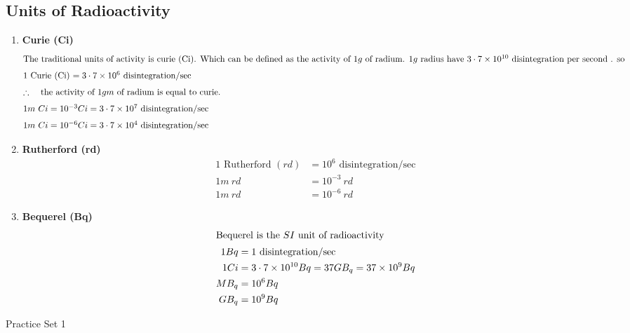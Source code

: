 \subsection{Units of Radioactivity}
\begin{enumerate}
\item \textbf{ Curie (Ci)}
\begin{align*}
\intertext{The traditional units of activity is curie (Ci). Which can be defined as the activity of $1g$ of radium. $1g$ radius have $3\cdot7 \times 10^{10}$ disintegration per second . so}
\intertext{$1 $  Curie (Ci) $=3\cdot7\times10^6$ disintegration/sec}
\intertext{$\therefore$ \quad the activity of $1gm$ of radium is equal to curie.}
\intertext{$1m \ Ci=10^{-3} Ci=3\cdot 7 \times 10^7 $ disintegration/sec}
\intertext{$1m \ Ci=10^{-6} Ci=3\cdot 7 \times 10^4 $ disintegration/sec}
\end{align*}
\item \textbf{Rutherford (rd)}
\begin{align*}
1 \text{ Rutherford } (rd) &= 10^6 \text{ disintegration/sec}\\
1 m\  rd&=10^{-3}\  rd\\
1 m\  rd&=10^{-6}\  rd
\end{align*}
\item \textbf{Bequerel (Bq)}
\begin{align*}
\intertext{Bequerel is the $SI$ unit of radioactivity}
1 Bq&=1 \text{ disintegration/sec}\\
1Ci&=3\cdot7\times10^{10}Bq =37GB_q=37\times10^9Bq\\
MB_q&=10^6Bq\\
GB_q&=10^9Bq
\end{align*}
\end{enumerate}
\newpage
\begin{abox}
	Practice Set 1 
\end{abox}
